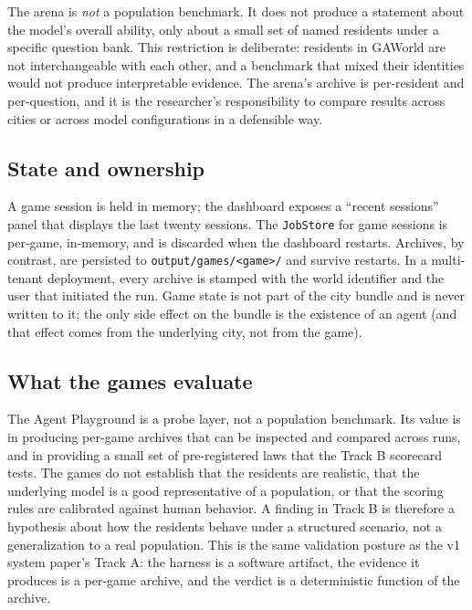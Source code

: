 The arena is \emph{not} a population benchmark.  It does not produce a
statement about the model's overall ability, only about a small set of
named residents under a specific question bank.  This restriction is
deliberate: residents in GAWorld are not interchangeable with each other,
and a benchmark that mixed their identities would not produce
interpretable evidence.  The arena's archive is per-resident and
per-question, and it is the researcher's responsibility to compare
results across cities or across model configurations in a defensible way.

\subsection{State and ownership}

A game session is held in memory; the dashboard exposes a ``recent
sessions'' panel that displays the last twenty sessions.  The
\texttt{JobStore} for game sessions is per-game, in-memory, and is
discarded when the dashboard restarts.  Archives, by contrast, are
persisted to \texttt{output/games/<game>/} and survive restarts.  In a
multi-tenant deployment, every archive is stamped with the world
identifier and the user that initiated the run.  Game state is not part
of the city bundle and is never written to it; the only side effect on
the bundle is the existence of an agent (and that effect comes from the
underlying city, not from the game).

\subsection{What the games evaluate}

The Agent Playground is a probe layer, not a population benchmark.  Its
value is in producing per-game archives that can be inspected and
compared across runs, and in providing a small set of pre-registered
laws that the Track B scorecard tests.  The games do not establish that
the residents are realistic, that the underlying model is a good
representative of a population, or that the scoring rules are calibrated
against human behavior.  A finding in Track B is therefore a hypothesis
about how the residents behave under a structured scenario, not a
generalization to a real population.  This is the same validation
posture as the v1 system paper's Track A: the harness is a software
artifact, the evidence it produces is a per-game archive, and the
verdict is a deterministic function of the archive.

